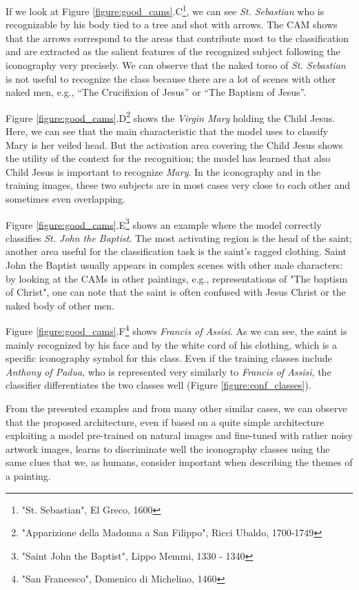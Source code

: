 \documentclass[acmlarge]{acmart}
\newcommand{\quoted}[1]{``#1''}
\begin{document}
If we look at Figure \ref{figure:good_cams}.C\footnote{"St. Sebastian", El Greco, 1600}, we can see \textit{St. Sebastian} who is recognizable by his body tied to a tree and shot with arrows. The CAM shows that the arrows correspond to the areas that contribute most to the classification and are extracted as the salient features of the recognized subject  following the iconography very precisely. We can observe that the naked torso of \textit{St. Sebastian} is not useful to recognize the class because there are a lot of scenes with other naked men, e.g., \quoted{The Crucifixion of Jesus} or \quoted{The Baptism of Jesus}.

Figure \ref{figure:good_cams}.D\footnote{"Apparizione della Madonna a San Filippo", Ricci Ubaldo, 1700-1749} shows the \textit{Virgin Mary} holding the Child Jesus. Here, we can see that the main characteristic that the model uses to classify Mary is her veiled head. But the activation  area covering the Child Jesus shows the utility of the context for the recognition;  the model has learned that also Child Jesus is important to recognize \textit{Mary}. In the iconography and in the training images, these two subjects are in most cases very close to each other and sometimes even overlapping.

Figure \ref{figure:good_cams}.E\footnote{"Saint John the Baptist", Lippo Memmi, 1330 - 1340} shows an example where the model correctly classifies \textit{St. John the Baptist}. The most activating region is the head of the saint; another area useful for the classification task is the saint's ragged clothing. Saint John the Baptist  usually appears in complex scenes with other male characters: by looking at the CAMs in other paintings, e.g., representations of  "The baptism of Christ", one can note that the saint is often confused with Jesus Christ or the naked body of other men.

Figure \ref{figure:good_cams}.F\footnote{"San Francesco", Domenico di Michelino, 1460} shows \textit{Francis of Assisi}. As we can see, the saint is mainly recognized by his face and  by the white cord of his clothing, which is a specific iconography symbol for this class. Even if the training classes include \textit{Anthony of Padua}, who is represented very similarly to \textit{Francis of Assisi}, the classifier differentiates  the two classes well (Figure \ref{figure:conf_classes}).

From the presented examples and from many other similar cases, we can observe that the proposed architecture, even if based on a quite simple architecture exploiting a model pre-trained   on natural images and fine-tuned with rather noisy artwork images, learns to discriminate well the  iconography classes using the same clues that we, as humans, consider important when describing the themes of a painting.
\end{document}
